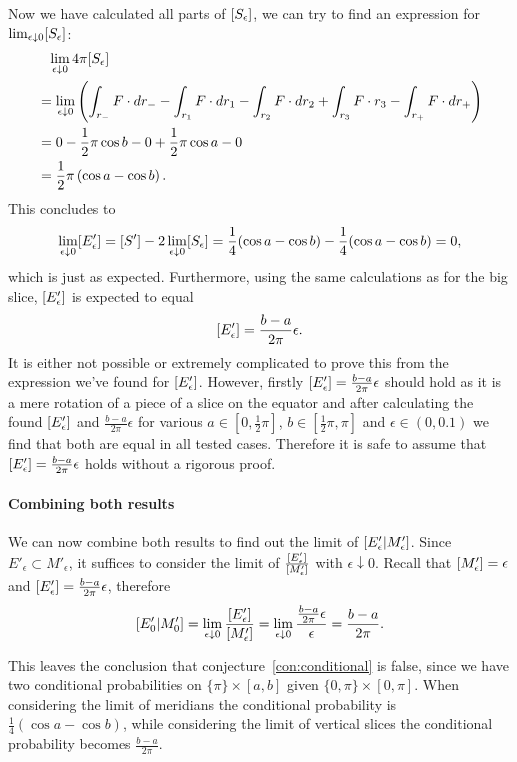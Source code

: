 \documentclass[twoside,a4paper]{article}
\theoremstyle{plain}
\theoremstyle{definition}
\theoremstyle{remark}
\numberwithin{equation}{section}
\let\P\relax
\DeclareMathOperator{\P}{\mathbb{P}}
\DeclareMathOperator{\1}{\mathbbm{1}}
\begin{document}
Now we have calculated all parts of $\P[S_\epsilon]$, we can try to find an expression for $\lim_{\epsilon\downarrow0}\P[S_\epsilon]$:
\begin{align*}
&\phantom{=}\lim_{\epsilon\downarrow0}4\pi\P[S_\epsilon]\\
&=\lim_{\epsilon\downarrow0}\left(\int_{r_-}F\cdot dr_- -\int_{r_1} F\cdot dr_1-\int_{r_2}F\cdot dr_2+\int_{r_3}F\cdot r_3-\int_{r_+}F\cdot dr_+\right)\\
&=0-\frac{1}{2}\pi\cos b-0+\frac{1}{2}\pi\cos a-0\\
&=\frac{1}{2}\pi\left(\cos a-\cos b\right).
\end{align*}
This concludes to
\[\lim_{\epsilon\downarrow0}\P[E'_\epsilon]=\P[S']-2\lim_{\epsilon\downarrow0}\P[S_\epsilon]=\frac{1}{4}(\cos a-\cos b)-\frac{1}{4}(\cos a-\cos b)=0,\]
which is just as expected. Furthermore, using the same calculations as for the big slice, $\P[E'_\epsilon]$ is expected to equal
\[\P[E'_\epsilon]=\frac{b-a}{2\pi}\epsilon.\]
It is either not possible or extremely complicated to prove this from the expression we've found for $\P[E'_\epsilon]$. However, firstly $\P[E'_\epsilon]=\frac{b-a}{2\pi}\epsilon$ should hold as it is a mere rotation of a piece of a slice on the equator and after calculating the found $\P[E'_\epsilon]$ and $\frac{b-a}{2\pi}{\epsilon}$ for various $a\in[0,\frac{1}{2}\pi]$, $b\in\left[\frac{1}{2}\pi,\pi\right]$ and $\epsilon\in(0,0.1)$ we find that both are equal in all tested cases. Therefore it is safe to assume that $\P[E'_\epsilon]=\frac{b-a}{2\pi}\epsilon$ holds without a rigorous proof.

\paragraph{Combining both results}
We can now combine both results to find out the limit of $\P[E'_\epsilon|M'_\epsilon]$. Since $E'_\epsilon\subset M'_\epsilon$, it suffices to consider the limit of $\frac{\P[E'_\epsilon]}{\P[M'_\epsilon]}$ with $\epsilon\downarrow 0$. Recall that $\P[M'_\epsilon]=\epsilon$ and $\P[E'_\epsilon]=\frac{b-a}{2\pi}{\epsilon}$, therefore
\[\P[E'_0|M'_0]=\lim_{\epsilon\downarrow0}\frac{\P[E'_\epsilon]}{\P[M'_\epsilon]}=\lim_{\epsilon\downarrow0}\frac{\frac{b-a}{2\pi}\epsilon}{\epsilon}=\frac{b-a}{2\pi}.\]

This leaves the conclusion that conjecture~\ref{con:conditional} is false, since we have two conditional probabilities on $\{\pi\}\times[a,b]$ given $\{0,\pi\}\times[0,\pi]$. When considering the limit of meridians the conditional probability is $\frac{1}{4}(\cos a-\cos b)$, while considering the limit of vertical slices the conditional probability becomes $\frac{b-a}{2\pi}$.
\end{document}
